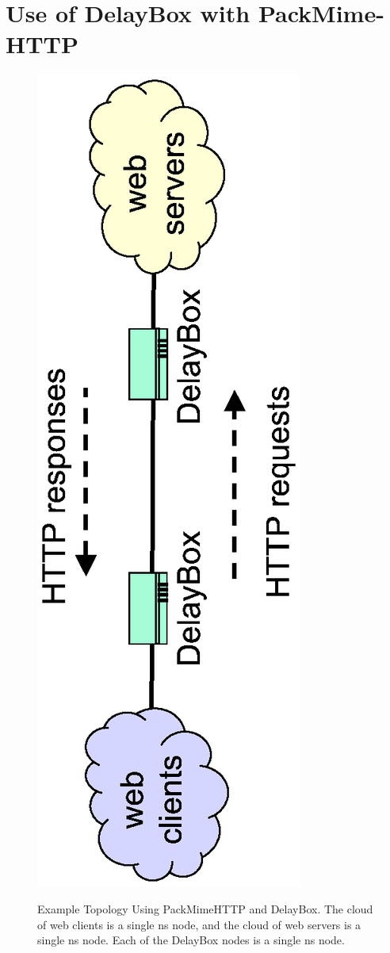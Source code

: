 \section{Use of DelayBox with PackMime-HTTP}
\label{sec:pm-db}

\begin{figure}
\centering
\includegraphics[scale=0.75, angle=270]{figures/packmime-delaybox.eps}
\label{fig-pmdb}
\caption{Example Topology Using PackMimeHTTP and DelayBox. The cloud of web clients is a single ns node, and the cloud of web servers is a single ns node. Each of the DelayBox nodes is a single ns node.}
\end{figure}  

